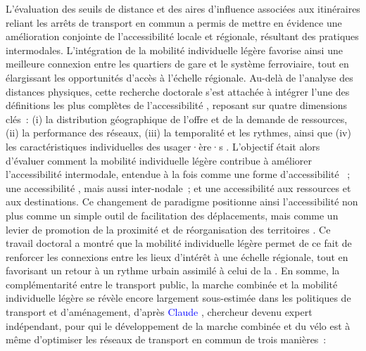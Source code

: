 \begin{refsegment}
L’évaluation des seuils de distance et des aires d’influence associées aux itinéraires reliant les arrêts de transport en commun a permis de mettre en évidence une amélioration conjointe de l’accessibilité locale et régionale, résultant des pratiques intermodales. L’intégration de la mobilité individuelle légère favorise ainsi une meilleure connexion entre les quartiers de gare et le système ferroviaire, tout en élargissant les opportunités d’accès à l’échelle régionale. Au-delà de l’analyse des distances physiques, cette recherche doctorale s'est attachée à intégrer l'une des définitions les plus complètes de l'accessibilité \textcolor{blue}{\autocite[3]{chapelon_accessibilite_2006}}, reposant sur quatre dimensions clés~: (i) la distribution géographique de l'offre et de la demande de ressources, (ii) la performance des réseaux, (iii) la temporalité et les rythmes, ainsi que (iv) les caractéristiques individuelles des usager·ère·s \textcolor{blue}{\autocite[128]{geurs_accessibility_2004}}. L’objectif était alors d’évaluer comment la mobilité individuelle légère contribue à améliorer l'accessibilité intermodale, entendue à la fois comme une forme d'accessibilité  \textcolor{blue}{\autocite[2]{silva_proximity-centred_2023}}~; une accessibilité  \textcolor{blue}{\autocite[283-343]{chapelon_offre_1997}}, mais aussi inter-nodale~; et une accessibilité aux ressources et aux destinations. Ce changement de paradigme positionne ainsi l’accessibilité non plus comme un simple outil de facilitation des déplacements, mais comme un levier de promotion de la proximité et de réorganisation des territoires \textcolor{blue}{\autocite[4]{levine_century_2020}}. Ce travail doctoral a montré que la mobilité individuelle légère permet de ce fait de renforcer les connexions entre les lieux d'intérêt à une échelle régionale, tout en favorisant un retour à un rythme urbain assimilé à celui de la  \textcolor{blue}{\autocite[9]{silva_proximity-centred_2023}}. En somme, la complémentarité entre le transport public, la marche combinée et la mobilité individuelle légère se révèle encore largement sous-estimée dans les politiques de transport et d’aménagement, d'après \textcolor{blue}{Claude} \textcolor{blue}{\textcite[6-7]{soulas_triptyque_2021}}, chercheur devenu expert indépendant, pour qui le développement de la marche combinée et du vélo est à même d'optimiser les réseaux de transport en commun de trois manières~:

\end{refsegment}
